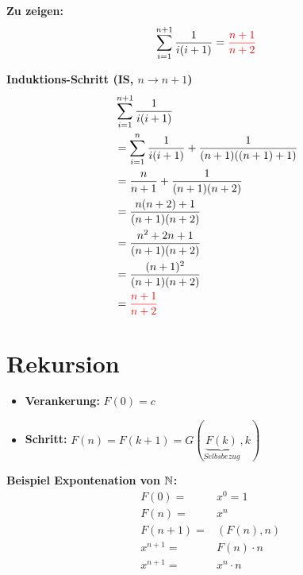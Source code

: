 \textbf{Zu zeigen:}
\begin{align*}
    \sum_{i=1}^{n+1} \frac{1}{i(i+1)} = \textcolor{red}{\frac{n+1}{n+2}}
\end{align*}

\textbf{Induktions-Schritt (IS, $n \to n+1$)}
\begin{align*}
    &\sum_{i=1}^{n+1} \frac{1}{i(i+1)}\\
    &= \sum_{i=1}^n \frac{1}{i(i+1)} + \frac{1}{(n+1)((n+1)+1)} \\
    &= \frac{n}{n+1} + \frac{1}{(n+1)(n+2)} \\
    &= \frac{n(n+2) + 1}{(n+1)(n+2)} \\
    &= \frac{n^2 + 2n + 1}{(n+1)(n+2)} \\
    &= \frac{(n+1)^2}{(n+1)(n+2)} \\
    &= \textcolor{red}{\frac{n+1}{n+2}}
\end{align*}

\section{Rekursion}
\begin{itemize}
    \item \textbf{Verankerung:} $F(0) = c$
    \item \textbf{Schritt:} $F(n) = F(k+1) = G(\underbrace{F(k)}_{Selbsbezug},k)$
\end{itemize}
\textbf{Beispiel Expontenation von $\mathbb{N}$:}
\begin{align*}
    & F(0) = &x^0 = 1 \\
    & F(n) = &x^n \\
    & F(n+1) = &(F(n),n)\\
    & x^{n+1} = &F(n) \cdot n \\
    & x^{n+1} = &x^n \cdot n
\end{align*}


